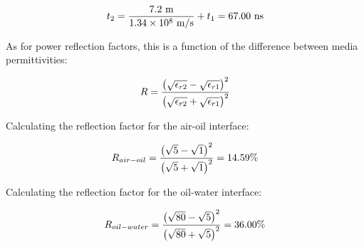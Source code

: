 \vskip 10pt

$$t_2 = {7.2 \hbox{ m} \over 1.34 \times 10^8 \hbox{ m/s}} + t_1 = 67.00 \hbox{ ns}$$

\vskip 30pt

As for power reflection factors, this is a function of the difference between media permittivities:

\vskip 10pt

$$R = {\left({\sqrt{\epsilon_{r2}} - \sqrt{\epsilon_{r1}}}\right)^2 \over \left(\sqrt{\epsilon_{r2}} + \sqrt{\epsilon_{r1}}\right)^2}$$

\vskip 10pt

Calculating the reflection factor for the air-oil interface:

$$R_{air-oil} = {\left({\sqrt{5} - \sqrt{1}}\right)^2 \over \left(\sqrt{5} + \sqrt{1}\right)^2} = 14.59\%$$

\vskip 10pt

Calculating the reflection factor for the oil-water interface:

$$R_{oil-water} = {\left({\sqrt{80} - \sqrt{5}}\right)^2 \over \left(\sqrt{80} + \sqrt{5}\right)^2} = 36.00\%$$




